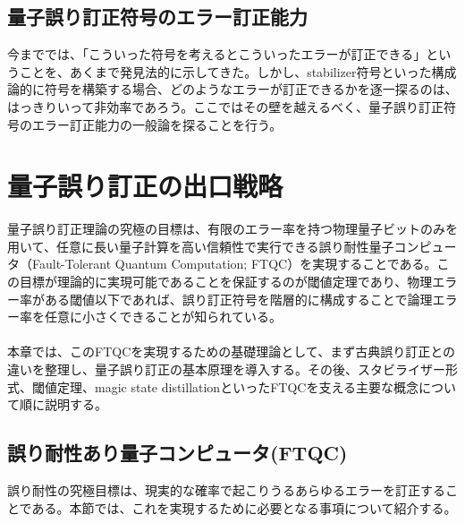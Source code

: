 \documentclass[a4paper,10.5pt]{article}
\numberwithin{equation}{section}
\begin{document}
\subsection{量子誤り訂正符号のエラー訂正能力}
今まででは、「こういった符号を考えるとこういったエラーが訂正できる」ということを、あくまで発見法的に示してきた。しかし、stabilizer符号といった構成論的に符号を構築する場合、どのようなエラーが訂正できるかを逐一探るのは、はっきりいって非効率であろう。ここではその壁を越えるべく、量子誤り訂正符号のエラー訂正能力の一般論を探ることを行う。



\section{量子誤り訂正の出口戦略}
量子誤り訂正理論の究極の目標は、有限のエラー率を持つ物理量子ビットのみを用いて、任意に長い量子計算を高い信頼性で実行できる誤り耐性量子コンピュータ（Fault-Tolerant Quantum Computation; FTQC）を実現することである。この目標が理論的に実現可能であることを保証するのが閾値定理であり、物理エラー率がある閾値以下であれば、誤り訂正符号を階層的に構成することで論理エラー率を任意に小さくできることが知られている。\\
\\
本章では、このFTQCを実現するための基礎理論として、まず古典誤り訂正との違いを整理し、量子誤り訂正の基本原理を導入する。その後、スタビライザー形式、閾値定理、magic state distillationといったFTQCを支える主要な概念について順に説明する。

\subsection{誤り耐性あり量子コンピュータ(FTQC)}
誤り耐性の究極目標は、現実的な確率で起こりうるあらゆるエラーを訂正することである。本節では、これを実現するために必要となる事項について紹介する。
\end{document}
